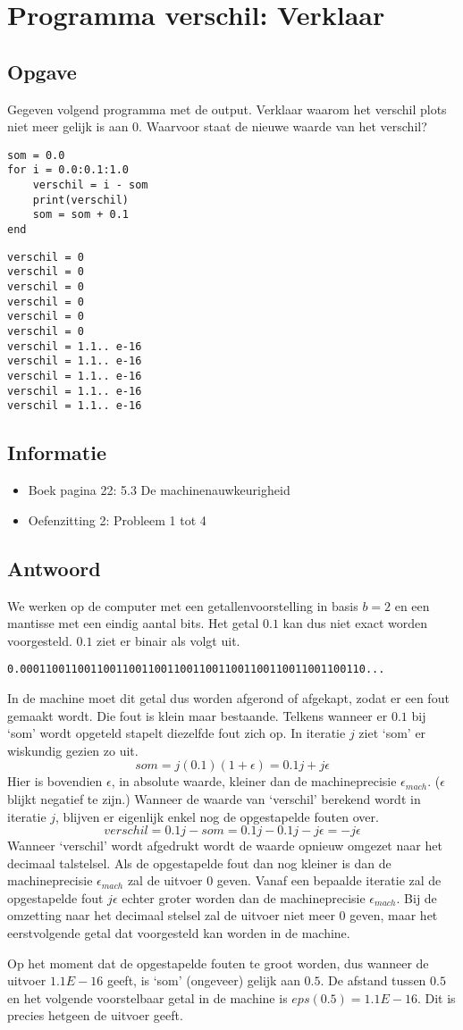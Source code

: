 \documentclass[examenvragen.tex]{subfiles}
\begin{document}
\section{Programma verschil: Verklaar}
\subsection{Opgave}
Gegeven volgend programma met de output. Verklaar waarom het verschil plots niet meer gelijk is aan $0$. Waarvoor staat de nieuwe waarde van het verschil?
\begin{lstlisting}
som = 0.0
for i = 0.0:0.1:1.0
	verschil = i - som
	print(verschil)
	som = som + 0.1
end
\end{lstlisting}
\begin{lstlisting}
verschil = 0
verschil = 0
verschil = 0
verschil = 0
verschil = 0
verschil = 0
verschil = 1.1.. e-16
verschil = 1.1.. e-16
verschil = 1.1.. e-16
verschil = 1.1.. e-16
verschil = 1.1.. e-16
\end{lstlisting}
\subsection{Informatie}
\begin{itemize}
\item Boek pagina 22: 5.3 De machinenauwkeurigheid
\item Oefenzitting 2: Probleem 1 tot 4
\end{itemize}
\subsection{Antwoord}
We werken op de computer met een getallenvoorstelling in basis $b=2$ en een mantisse met een eindig aantal bits.
Het getal $0.1$ kan dus niet exact worden voorgesteld.
$0.1$ ziet er binair als volgt uit.
\begin{verbatim}
0.000110011001100110011001100110011001100110011001100110...
\end{verbatim}
In de machine moet dit getal dus worden afgerond of afgekapt, zodat er een fout gemaakt wordt. Die fout is klein maar bestaande.
Telkens wanneer er $0.1$ bij `som' wordt opgeteld stapelt diezelfde fout zich op. In iteratie $j$ ziet `som' er wiskundig gezien zo uit. 
\[
som = j(0.1)(1+\epsilon) = 0.1j + j\epsilon
\]
Hier is bovendien $\epsilon$, in absolute waarde, kleiner dan de machineprecisie $\epsilon_{mach}$. ($\epsilon$ blijkt negatief te zijn.)
Wanneer de waarde van `verschil' berekend wordt in iteratie $j$, blijven er eigenlijk enkel nog de opgestapelde fouten over.
\[
verschil = 0.1j - som = 0.1j - 0.1j -j\epsilon = -j\epsilon
\]
Wanneer `verschil' wordt afgedrukt wordt de waarde opnieuw omgezet naar het decimaal talstelsel. Als de opgestapelde fout dan nog kleiner is dan de machineprecisie $\epsilon_{mach}$ zal de uitvoer $0$ geven.
Vanaf een bepaalde iteratie zal de opgestapelde fout $j\epsilon$ echter groter worden dan de machineprecisie $\epsilon_{mach}$. Bij de omzetting naar het decimaal stelsel zal de uitvoer niet meer $0$ geven, maar het eerstvolgende getal dat voorgesteld kan worden in de machine.

Op het moment dat de opgestapelde fouten te groot worden, dus wanneer de uitvoer $1.1E-16$ geeft, is `som' (ongeveer) gelijk aan $0.5$. De afstand tussen $0.5$ en het volgende voorstelbaar getal in de machine is $eps(0.5) = 1.1E-16$. Dit is precies hetgeen de uitvoer geeft.
\end{document}
